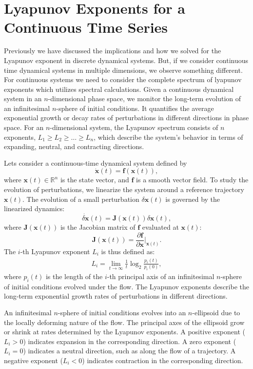 \section{Lyapunov Exponents for a Continuous Time Series}

Previously we have discussed the implications and how we solved for the Lyapunov exponent in discrete dynamical systems. 
But, if we consider continuous time dynamical systems in multiple dimensions, we observe something different. 
For continuous systems we need to consider the complete spectrum of lyapunov exponents which utilizes spectral calculations. 
Given a continuous dynamical system in an $n$-dimensional phase space, we monitor the long-term evolution of an infinitesimal $n$-sphere of initial conditions. 
It quantifies the average exponential growth or decay rates of perturbations in different directions in phase space. 
For an $n$-dimensional system, the Lyapunov spectrum consists of $n$ exponents, $L_1 \geq L_2 \geq \dots \geq L_n$, which describe the system's behavior in terms of expanding, neutral, and contracting directions.

Lets consider a continuous-time dynamical system defined by
$$
\dot{\mathbf{x}}(t) = \mathbf{f}(\mathbf{x}(t)),
$$
where $\mathbf{x}(t) \in \mathbb{R}^n$ is the state vector, and $\mathbf{f}$ is a smooth vector field. To study the evolution of perturbations, we linearize the system around a reference trajectory $\mathbf{x}(t)$. The evolution of a small perturbation $\delta\mathbf{x}(t)$ is governed by the linearized dynamics:
$$
\dot{\delta\mathbf{x}}(t) = \mathbf{J}(\mathbf{x}(t)) \delta\mathbf{x}(t),
$$
where $\mathbf{J}(\mathbf{x}(t))$ is the Jacobian matrix of $\mathbf{f}$ evaluated at $\mathbf{x}(t)$:
$$
\mathbf{J}(\mathbf{x}(t)) = \frac{\partial \mathbf{f}}{\partial \mathbf{x}} \bigg|_{\mathbf{x}(t)}.
$$
The $i$-th Lyapunov exponent $L_i$ is thus defined as:
\begin{align}
    L_i = \lim_{t \to \infty} \frac{1}{t} \log_2 \frac{p_i(t)}{p_i(0)}, \label{eq:continuous}
\end{align}
where $p_i(t)$ is the length of the $i$-th principal axis of an infinitesimal $n$-sphere of initial conditions evolved under the flow. The Lyapunov exponents describe the long-term exponential growth rates of perturbations in different directions.

An infinitesimal $n$-sphere of initial conditions evolves into an $n$-ellipsoid due to the locally deforming nature of the flow. The principal axes of the ellipsoid grow or shrink at rates determined by the Lyapunov exponents. A positive exponent ($L_i > 0$) indicates expansion in the corresponding direction. A zero exponent ($L_i = 0$) indicates a neutral direction, such as along the flow of a trajectory. A negative exponent ($L_i < 0$) indicates contraction in the corresponding direction.

